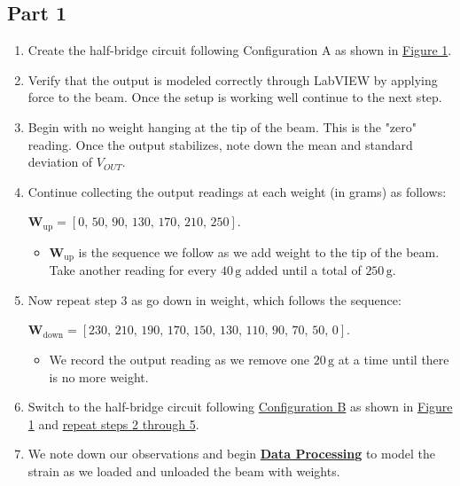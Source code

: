 \documentclass{article}
\begin{document}
\subsection{Part 1}
\begin{enumerate}
    \item Create the half-bridge circuit following Configuration A as shown in \hyperlink{fig1}{Figure 1}. 
    \item Verify that the output is modeled correctly through LabVIEW by applying force to the beam. Once the setup is working well continue to the next step.
    \item Begin with no weight hanging at the tip of the beam. This is the "zero" reading. Once the output stabilizes, note down the mean and standard deviation of $V_{OUT}$.
    \item Continue collecting the output readings at each weight (in grams) as follows:
    \vspace{0.5mm}
    
    $\textbf{W}_{\text{up}} = \left[0,\, 50,\, 90,\, 130,\, 170,\, 210,\, 250\right]$. 
    \begin{itemize}
        \item $\textbf{W}_{\text{up}}$ is the sequence we follow as we add weight to the tip of the beam. Take another reading for every $40\, \text{g}$ added until a total of $250\, \text{g}$.
    \end{itemize}
    
    \item Now repeat step 3 as go down in weight, which follows the sequence:
    \vspace{0.5mm}
    
    $\textbf{W}_{\text{down}} = \left[230,\, 210,\, 190,\, 170,\, 150,\, 130,\, 110,\, 90,\, 70,\, 50,\, 0\right]$.
    \begin{itemize}
        \item We record the output reading as we remove one $20\, \text{g}$ at a time until there is no more weight. 
    \end{itemize}

    \item Switch to the half-bridge circuit following \underline{Configuration B} as shown in \hyperlink{fig1}{Figure 1} and \ul{repeat steps 2 through 5}.

    \item We note down our observations and begin \hyperlink{datapro}{\textbf{Data Processing}} to model the strain as we loaded and unloaded the beam with weights.
\end{enumerate}
\end{document}
